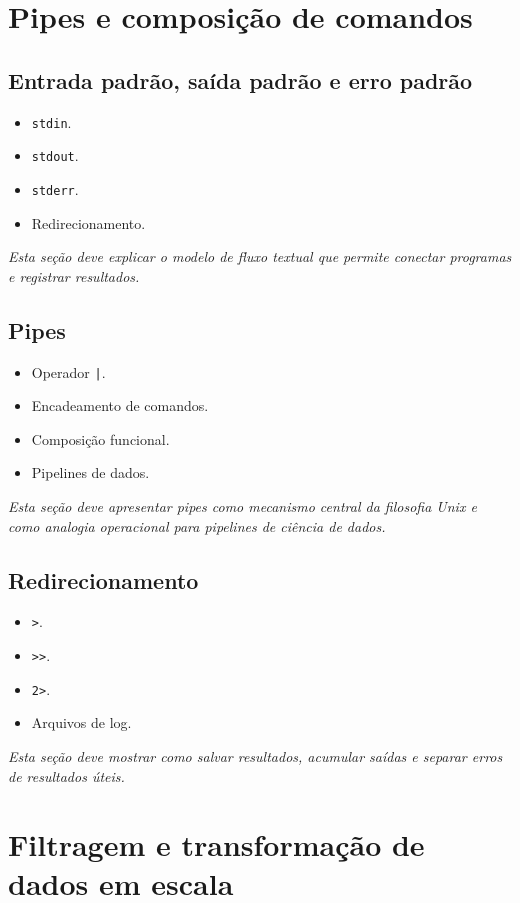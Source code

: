 \documentclass[12pt,openany]{book}
\newcommand{\placeholder}[1]{
    \par\medskip
    \noindent\textit{#1}
    \par\medskip
}
\newcommand{\topicos}[1]{
    \begin{itemize}
        #1
    \end{itemize}
}
\begin{document}
\begin{refsection}
\chapter{Pipes e composição de comandos}

\section{Entrada padrão, saída padrão e erro padrão}

\topicos{
    \item \texttt{stdin}.
    \item \texttt{stdout}.
    \item \texttt{stderr}.
    \item Redirecionamento.
}

\placeholder{Esta seção deve explicar o modelo de fluxo textual que permite conectar programas e registrar resultados.}

\section{Pipes}

\topicos{
    \item Operador \texttt{|}.
    \item Encadeamento de comandos.
    \item Composição funcional.
    \item Pipelines de dados.
}

\placeholder{Esta seção deve apresentar pipes como mecanismo central da filosofia Unix e como analogia operacional para pipelines de ciência de dados.}

\section{Redirecionamento}

\topicos{
    \item \texttt{>}.
    \item \texttt{>>}.
    \item \texttt{2>}.
    \item Arquivos de log.
}

\placeholder{Esta seção deve mostrar como salvar resultados, acumular saídas e separar erros de resultados úteis.}

\chapter{Filtragem e transformação de dados em escala}


\end{refsection}
\end{document}
